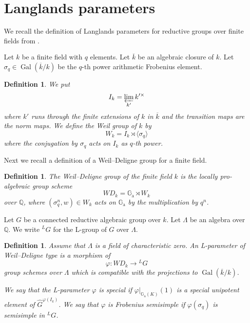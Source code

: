 \documentclass[12pt,a4paper]{article}
\newtheorem{defn}[thm]{Definition}
\DeclareMathOperator{\Gal}{Gal}
\newcommand{\mb}{\mathbb}
\newcommand{\mr}{\mathrm}
\newcommand{\ol}{\overline}
\newcommand{\wh}{\widehat}
\newcommand{\Ga}{\mathbb{G}_{\mathrm{a}}}
\begin{document}
\section{Langlands parameters}\label{sec:WD} 

We recall the definition of Langlands parameters for reductive groups over finite fields from \cite{IVLpfin}. 

Let $k$ be a finite field with $q$ elements. 
Let $\ol{k}$ be an algebraic closure of $k$. 
Let $\sigma_q \in \Gal(\ol{k}/k)$ be the $q$-th power  arithmetic Frobenius element. 

\begin{defn}\label{def:finiteweilZ}
	We put
	\begin{equation}\label{e:finiteweil}
		I_k = \varprojlim_{k'} k'^\times
	\end{equation}
	where $k'$ runs through the finite extensions of $k$ in $\ol{k}$ and the transition maps are the norm maps. 
	We define the Weil group of $k$ by
	\begin{equation}
		W_k = I_k \rtimes \langle \sigma_q \rangle
	\end{equation}
	where the conjugation by $\sigma_q$ acts on $I_k$ as $q$-th power.
\end{defn}

Next we recall a definition of a Weil--Deligne group for a finite field.  

\begin{defn}\label{def:finweilDel}
	The Weil--Deligne group of the finite
	field $k$ is the locally pro-algebraic group
	scheme
		\begin{equation}
			\mathit{WD}_k =\Ga \rtimes W_k
		\end{equation}
over $\mb{Q}$, where $(\sigma_q^n,w) \in W_k$ acts on $\Ga$ by the multiplication by $q^n$.
\end{defn}

Let $G$ be a connected reductive algebraic group over
$k$. Let $\Lambda$ be an algebra over $\mb{Q}$. 
We write ${}^L G$ for the L-group of $G$ over $\Lambda$. 

\begin{defn}
Assume that $\Lambda$ is a field of characteristic zero. 
An L-parameter of Weil--Deligne type is a morphism of 
		\begin{equation}
			\varphi \colon \mathit{WD}_k \rightarrow {}^L G
		\end{equation}
group schemes over $\Lambda$ which is compatible with the projections to $\Gal (\ol{k}/k)$. 

We say that the L-parameter $\varphi$ is special
		if $\varphi|_{\Ga (K)}(1)$ is a special unipotent element of
		$\wh{G}^{\varphi (I_k)}$.
		We say that $\varphi$ is Frobenius semisimple if
		$\varphi(\sigma_q)$ is semisimple in ${}^L G$.
\end{defn}
\end{document}
